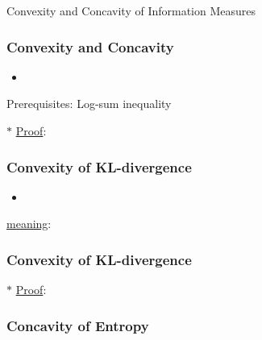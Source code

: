 \documentclass[9pt]{beamer}
\begin{document}
    \begin{section}{Convexity and Concavity of Information Measures}
        \begin{frame}
            \frametitle{Convexity and Concavity}
        
            \begin{definition}[convexity]
                
            \end{definition}
            \begin{definition}[concavity]
                
            \end{definition}
            \begin{itemize}
                \item 
            \end{itemize}
        \end{frame}

        \begin{frame}{Prerequisites: Log-sum inequality}
            \begin{lemma}
                
            \end{lemma}
            
            $\ast$ \underline{Proof}:
        \end{frame}
    
        \begin{frame}
            \frametitle{Convexity of KL-divergence}
            \begin{theorem}
                
            \end{theorem}
            \begin{itemize}
                \item 
            \end{itemize}
            \checkmark \underline{meaning}:
        \end{frame}

        \begin{frame}
            \frametitle{Convexity of KL-divergence}
            $\ast$ \underline{Proof}:
            
        \end{frame}

        \begin{frame}
            \frametitle{Concavity of Entropy}
            \begin{corollary}
                

\end{corollary}
\end{frame}
\end{section}
\end{document}
